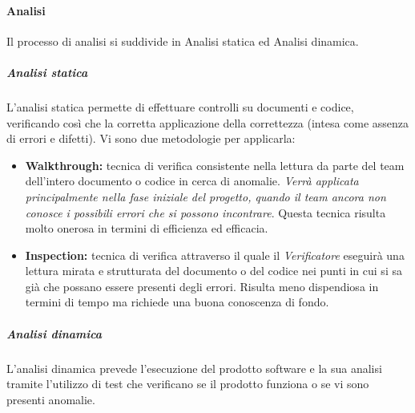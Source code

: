 \paragraph{Analisi}
Il processo di analisi si suddivide in Analisi statica ed Analisi dinamica.
\subparagraph{Analisi statica}
L'analisi statica permette di effettuare controlli su documenti e codice, verificando così che la corretta applicazione della correttezza (intesa come assenza di errori e difetti). Vi sono due metodologie per applicarla:
\begin{itemize}
	\item \textbf{Walkthrough:} tecnica di verifica consistente nella lettura da parte del team dell'intero documento o codice in cerca di anomalie. \textit{Verrà applicata principalmente nella fase iniziale del progetto, quando il team ancora non conosce i possibili errori che si possono incontrare}. Questa tecnica risulta molto onerosa in termini di efficienza ed efficacia.
	\item \textbf{Inspection:} tecnica di verifica attraverso il quale il \textit{Verificatore} eseguirà una lettura mirata e strutturata del documento o del codice nei punti in cui si sa già che possano essere presenti degli errori. Risulta meno dispendiosa in termini di tempo ma richiede una buona conoscenza di fondo.
\end{itemize}
\subparagraph{Analisi dinamica}
L'analisi dinamica prevede l'esecuzione del prodotto software e la sua analisi tramite l'utilizzo di test che verificano se il prodotto funziona o se vi sono presenti anomalie.
